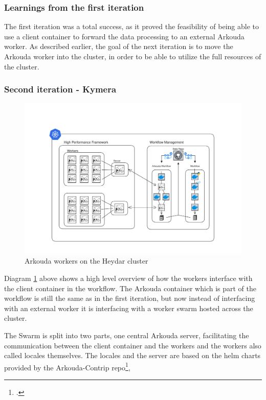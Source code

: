 \subsubsection*{Learnings from the first iteration}

The first iteration was a total success, as it proved the feasibility of being able to use a client container to forward the data processing to an external Arkouda worker.
As described earlier, the goal of the next iteration is to move the Arkouda worker into the cluster, in order to be able to utilize the full resources of the cluster.

\subsubsection{Second iteration - Kymera}

\begin{figure}[htb]
    \centering
    \includegraphics[width=16cm]{graphics/PachyKouda.png}
    \caption[Arkouda workers on \ac{k8s}]{Arkouda workers on the Heydar cluster}
    \label{abb:arkouda_workers_on_k8s}
\end{figure}

Diagram \ref{abb:arkouda_workers_on_k8s} above shows a high level overview of how the workers interface with the client container in the workflow.
The Arkouda container which is part of the workflow is still the same as in the first iteration, but now instead of interfacing with an external worker it 
is interfacing with a worker swarm hosted across the cluster.

The Swarm is split into two parts, one central Arkouda server, facilitating the communication between the client container and the workers and the workers also called locales themselves.
The locales and the server are based on the helm charts provided by the Arkouda-Contrip repo\footcite{BearsRUsArkoudacontribArkoudahelmcharts},

